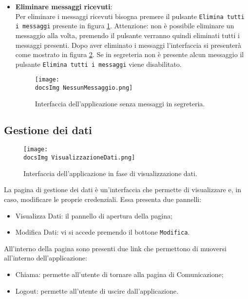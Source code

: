 {{\begin{itemize}
\begin{figure}[h!]
	\centering
		\texttt{[image: \\docsImg LetturaMessaggio.png]}
		\caption{Interfaccia dell'applicazione in fase di lettura messaggi.} 
		\label{fig:imgComLetMes}
	\end{figure}

\item \textbf{Eliminare messaggi ricevuti}:\\
Per eliminare i messaggi ricevuti bisogna premere il pulsante \texttt{Elimina tutti i messaggi} presente in figura \ref{fig:imgComLetMes}. Attenzione: non è possibile eliminare un messaggio alla volta, premendo il pulsante verranno quindi eliminati tutti i messaggi presenti. Dopo aver eliminato i messaggi l'interfaccia si presenterà come mostrato in figura \ref{fig:imgComNesMes}. Se in segreteria non è presente alcun messaggio il pulsante \texttt{Elimina tutti i messaggi} viene disabilitato.

\begin{figure}[h!]
	\centering
		\texttt{[image: \\docsImg NessunMessaggio.png]}
		\caption{Interfaccia dell'applicazione senza messaggi in segreteria.} 
		\label{fig:imgComNesMes}
	\end{figure}

\end{itemize}

\newpage

\subsection{Gestione dei dati}{
\label{gestDati}
\begin{figure}[h!]
	\centering
		\texttt{[image: \\docsImg VisualizzazioneDati.png]}
		\caption{Interfaccia dell'applicazione in fase di visualizzazione dati.} 
		\label{fig:imgVisDati}
	\end{figure}

La pagina di gestione dei dati è un’interfaccia che permette di visualizzare e, in caso, modificare le proprie credenziali. Essa presenta due pannelli:
\begin{itemize}
	\item Visualizza Dati: il pannello di apertura della pagina;
	\item Modifica Dati: vi si accede premendo il bottone \texttt{Modifica}.
\end{itemize}
All’interno della pagina sono presenti due link che permettono di muoversi all’interno dell’applicazione:
\begin{itemize}
	\item Chiama: permette all’utente di tornare alla pagina di Comunicazione;
	\item Logout: permette all’utente di uscire dall’applicazione. 
\end{itemize}
}

}}
